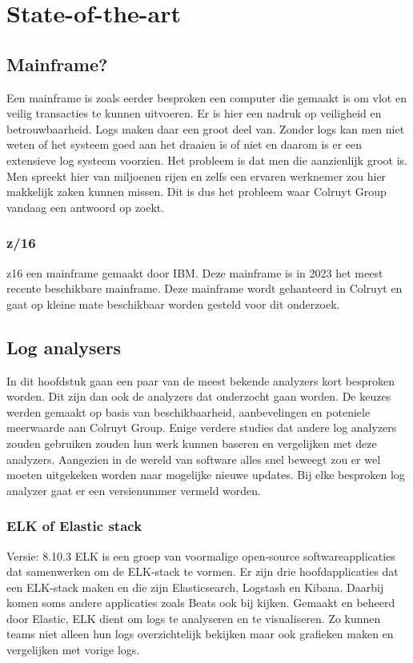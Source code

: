 \section{State-of-the-art}%
\label{sec:state-of-the-art}

\subsection{Mainframe?}
Een mainframe is zoals eerder besproken een computer die gemaakt is om vlot en veilig transacties te kunnen uitvoeren. Er is hier een nadruk op veiligheid en betrouwbaarheid. Logs maken daar een groot deel van. Zonder logs kan men niet weten of het systeem goed aan het draaien is of niet en daarom is er een extensieve log systeem voorzien. Het probleem is dat men die aanzienlijk groot is. Men spreekt hier van miljoenen rijen en zelfs een ervaren werknemer zou hier makkelijk zaken kunnen missen. Dit is dus het probleem waar Colruyt Group vandaag een antwoord op zoekt. ~\autocite{IBM2023(1),IBM2023(2),IBMArchives}

\subsubsection{z/16}
z16 een mainframe gemaakt door IBM. Deze mainframe is in 2023 het meest recente beschikbare mainframe. Deze mainframe wordt gehanteerd in Colruyt en gaat op kleine mate beschikbaar worden gesteld voor dit onderzoek. \newline ~\autocite{Laura2023} 

\subsection{Log analysers}
In dit hoofdstuk gaan een paar van de meest bekende analyzers kort besproken worden. Dit zijn dan ook de analyzers dat onderzocht gaan worden. De keuzes werden gemaakt op basis van beschikbaarheid, aanbevelingen en poteniele meerwaarde aan Colruyt Group. Enige verdere studies dat andere log analyzers zouden gebruiken zouden hun werk kunnen baseren en vergelijken met deze analyzers. Aangezien in de wereld van software alles snel beweegt zou er wel moeten uitgekeken worden naar mogelijke nieuwe updates. Bij elke besproken log analyzer gaat er een versienummer vermeld worden. 

\subsubsection{ELK of Elastic stack}
Versie: 8.10.3 \newline
ELK is een groep van voormalige open-source softwareapplicaties dat samenwerken om de ELK-stack te vormen. Er zijn drie hoofdapplicaties dat een ELK-stack maken en die zijn Elasticsearch, Logstash en Kibana. Daarbij komen soms andere applicaties zoals Beats ook bij kijken. Gemaakt en beheerd door Elastic, ELK dient om logs te analyseren en te visualiseren. Zo kunnen teams niet alleen hun logs overzichtelijk bekijken maar ook grafieken maken en vergelijken met vorige logs. ~\autocite{Elatic(1),DotanHorovits}

